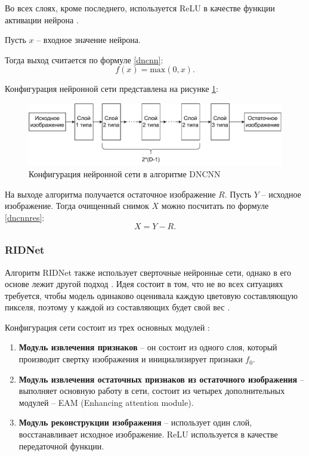 Во всех слоях, кроме последнего, используется ReLU в качестве функции активации нейрона \cite{dcnn}. 

Пусть $x$ -- входное значение нейрона. 

Тогда выход считается по формуле \ref{dncnn}: 
\begin{equation}
	\label{dncnn}
	f(x) = \mathrm{max}(0, x).
\end{equation}

Конфигурация нейронной сети представлена на рисунке \ref{fig::dncnn}:
\FloatBarrier
\begin{figure}[h]	
	\begin{center}
		\includegraphics[width=\linewidth]{inc/pdf/dnn.pdf}
	\end{center}
	\captionsetup{justification=centering}
	\caption{Конфигурация нейронной сети в алгоритме DNCNN}
	\label{fig::dncnn}
\end{figure}
\FloatBarrier

\newpage
На выходе алгоритма получается остаточное изображение $R$. 
Пусть $Y$ -- исходное изображение.
Тогда очищенный снимок $X$ можно посчитать по формуле \ref{dncnnres}:
\begin{equation}
	\label{dncnnres}
	X = Y - R.
\end{equation}

\subsubsection{RIDNet}
Алгоритм RIDNet также использует сверточные нейронные сети, однако в его основе лежит другой подход \cite{ridnet2}.
Идея состоит в том, что не во всех ситуациях требуется, чтобы модель одинаково оценивала каждую цветовую составляющую пикселя, поэтому у каждой из составляющих будет свой вес \cite{ridnet}.

Конфигурация сети состоит из трех основных модулей \cite{ridnet}: 
\begin{enumerate}
	\item \textbf{Модуль извлечения признаков} -- он состоит из одного слоя, который производит свертку изображения и инициализирует  признаки $f_0$.
	\item \textbf{Модуль извлечения остаточных признаков из остаточного изображения} -- выполняет основную работу в сети, состоит из четырех дополнительных модулей -- EAM (Enhancing attention module).
	\item  \textbf{Модуль реконструкции изображения} -- использует один слой, восстанавливает исходное изображение. ReLU используется в качестве передаточной функции.
\end{enumerate}

